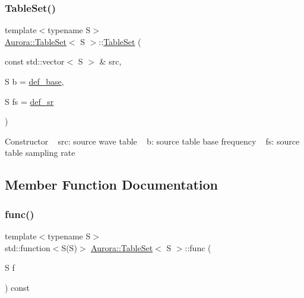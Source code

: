 \subsubsection{\texorpdfstring{Table\+Set()}{TableSet()}\hspace{0.1cm}{\footnotesize\ttfamily [2/2]}}
{\footnotesize\ttfamily template$<$typename S$>$ \\
\hyperlink{class_aurora_1_1_table_set}{Aurora\+::\+Table\+Set}$<$ S $>$\+::\hyperlink{class_aurora_1_1_table_set}{Table\+Set} (\begin{DoxyParamCaption}\item[{const std\+::vector$<$ S $>$ \&}]{src,  }\item[{S}]{b = {\ttfamily \hyperlink{namespace_aurora_acb267dff62f74484893c2d5b679b78bf}{def\+\_\+base}},  }\item[{S}]{fs = {\ttfamily \hyperlink{namespace_aurora_ad49263d809bea98dd422e95bc91bc03e}{def\+\_\+sr}} }\end{DoxyParamCaption})\hspace{0.3cm}{\ttfamily [inline]}}

Constructor ~\newline
src\+: source wave table ~\newline
b\+: source table base frequency ~\newline
fs\+: source table sampling rate 

\subsection{Member Function Documentation}
\mbox{\label{class_aurora_1_1_table_set_a27a325a2c3c4b8cd50e0c86d6ac3c617}} 
\subsubsection{\texorpdfstring{func()}{func()}}
{\footnotesize\ttfamily template$<$typename S$>$ \\
std\+::function$<$S(S)$>$ \hyperlink{class_aurora_1_1_table_set}{Aurora\+::\+Table\+Set}$<$ S $>$\+::func (\begin{DoxyParamCaption}\item[{S}]{f }\end{DoxyParamCaption}) const\hspace{0.3cm}{\ttfamily [inline]}}

